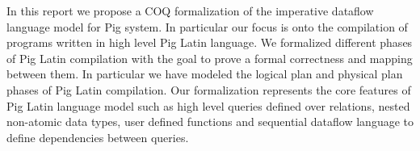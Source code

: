 In this report we propose a COQ formalization of the imperative dataflow language model for Pig system. In particular our focus is onto the compilation of programs written in high level Pig Latin language. We formalized different phases of Pig Latin compilation with the goal to prove a formal correctness and mapping between them. In particular we have modeled the logical plan and physical plan phases of Pig Latin compilation. Our formalization represents the core features of Pig Latin language model such as high level queries defined over relations, nested non-atomic data types, user defined functions and sequential dataflow language to define dependencies between queries.
